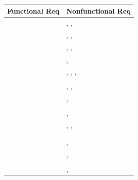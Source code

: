 \documentclass[12pt]{article}
\newcommand{\descriptiveid}[1]{\texttt{\detokenize{#1}}}
\newcommand{\idref}[1]{\hyperref[#1]{\descriptiveid{#1}}}
\newcommand{\rref}[1]{\idref{#1}}
\begin{document}
  \begin{longtable}{p{} p{}}

    \toprule
    Functional Req & Nonfunctional Req \\
    \midrule
    \rref{FR_SupervisorProposal} & \idref{NFR_UsabilityFirstSuccess}, \idref{NFR_LearnUnassisted}, \idref{NFR_ConcurrencySafety} \\ \hline
    \rref{FR_ProposalOptionalFields} & \idref{NFR_UsabilityFirstSuccess}, \idref{NFR_LearnUnassisted}, \idref{NFR_ConcurrencySafety} \\ \hline
    \rref{FR_StudentProposal} & \idref{NFR_UsabilityFirstSuccess}, \idref{NFR_LearnUnassisted}, \idref{NFR_ConcurrencySafety} \\ \hline
    \rref{FR_ReviewProposal} & \idref{NFR_Authorize}, \idref{NFR_AuditLog} \\ \hline
    \rref{FR_ViewApprovedProjects} & \idref{NFR_UsabilityFirstSuccess}, \idref{NFR_LearnUnassisted}, \idref{NFR_PerfTail}, \idref{NFR_PeakUsers} \\ \hline
    \rref{FR_ViewProjectStatus} & \idref{NFR_ConcurrencySafety} \\ \hline
    \rref{FR_StudentProfile} & \idref{NFR_Authorize}, \idref{NFR_EssentialPersonal}, \idref{NFR_EncryptRest} \\ \hline
    \rref{FR_StudentTeams} & \idref{NFR_ConcurrencySafety}, \idref{NFR_AuditLog} \\ \hline
    \rref{FR_ValidateTeamRules} & \idref{NFR_ConcurrencySafety} \\ \hline
    \rref{FR_TeamDiscovery} & \idref{NFR_UsabilityFirstSuccess}, \idref{NFR_LearnUnassisted} \\ \hline
    \rref{FR_TeamProfile} & \idref{NFR_UsabilityFirstSuccess}, \idref{NFR_LearnUnassisted}, \idref{NFR_Authorize} \\ \hline
    \rref{FR_TeamRecommend} & \idref{NFR_ChangeEffort} \\ \hline
    \rref{FR_ProjectInterest} & \idref{NFR_ConcurrencySafety} \\ \hline
    \rref{FR_DeclineTeam} & \idref{NFR_ConcurrencySafety}, \idref{NFR_AuditLog} \\ \hline
    \rref{FR_ProjectThreads} & \idref{NFR_Authorize}, \idref{NFR_AuditLog} \\ \hline
    \rref{FR_ThreadsNotify} & \idref{NFR_Uptime} \\ \hline
    \rref{FR_RequestApproval} & \idref{NFR_ConcurrencySafety}, \idref{NFR_AuditLog} \\ \hline

\end{longtable}
\end{document}

